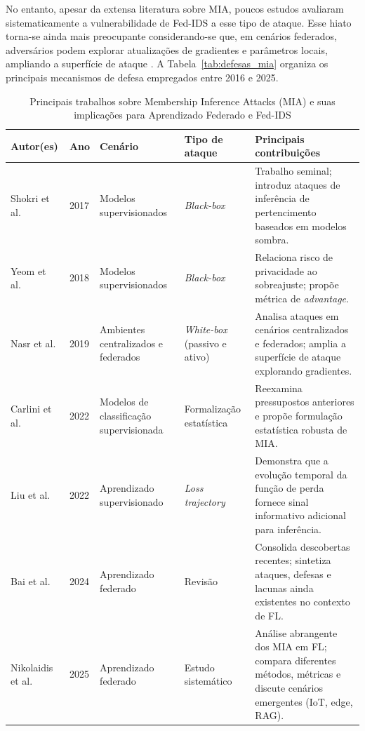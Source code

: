 \documentclass[
	12pt,				%
	openright,			%
	oneside,			%
	a4paper,			%
	english,			%
	french,				%
	spanish,			%
	brazil,				%
	]{abntex2}
\begin{document}
No entanto, apesar da extensa literatura sobre MIA, poucos estudos avaliaram sistematicamente a vulnerabilidade de Fed-IDS a esse tipo de ataque. Esse hiato torna-se ainda mais preocupante considerando-se que, em cenários federados, adversários podem explorar atualizações de gradientes e parâmetros locais, ampliando a superfície de ataque \cite{nasr2019comprehensive}. 
A Tabela~\ref{tab:defesas_mia} organiza os principais mecanismos de defesa empregados entre 2016 e 2025.
\begin{table}[H]
\centering
\footnotesize
\caption{Principais trabalhos sobre Membership Inference Attacks (MIA) e suas implicações para Aprendizado Federado e Fed-IDS}
\label{tab:mia_fedids}
\begin{tabular}{p{3.2cm}p{1.2cm}p{2.8cm}p{2.8cm}p{5.2cm}}
\toprule
\textbf{Autor(es)} & \textbf{Ano} & \textbf{Cenário} & \textbf{Tipo de ataque} & \textbf{Principais contribuições} \\
\midrule
Shokri et al. \cite{shokri2017mia} & 2017 & Modelos supervisionados & \textit{Black-box} & Trabalho seminal; introduz ataques de inferência de pertencimento baseados em modelos sombra. \\
Yeom et al. \cite{yeom2018privacyrisk} & 2018 & Modelos supervisionados & \textit{Black-box} & Relaciona risco de privacidade ao sobreajuste; propõe métrica de \textit{advantage}. \\
Nasr et al. \cite{nasr2019comprehensive} & 2019 & Ambientes centralizados e federados & \textit{White-box} (passivo e ativo) & Analisa ataques em cenários centralizados e federados; amplia a superfície de ataque explorando gradientes. \\
Carlini et al. \cite{carlini2022firstprinciples} & 2022 & Modelos de classificação supervisionada & Formalização estatística & Reexamina pressupostos anteriores e propõe formulação estatística robusta de MIA. \\
Liu et al. \cite{liu2022trajectory} & 2022 & Aprendizado supervisionado & \textit{Loss trajectory} & Demonstra que a evolução temporal da função de perda fornece sinal informativo adicional para inferência. \\
Bai et al. \cite{bai2024survey} & 2024 & Aprendizado federado & Revisão & Consolida descobertas recentes; sintetiza ataques, defesas e lacunas ainda existentes no contexto de FL. \\
Nikolaidis et al. \cite{nikolaidis2025studyfl} & 2025 & Aprendizado federado & Estudo sistemático & Análise abrangente dos MIA em FL; compara diferentes métodos, métricas e discute cenários emergentes (IoT, edge, RAG). \\
\bottomrule
\end{tabular}
\\[0.5em]
\end{table}
\end{document}
